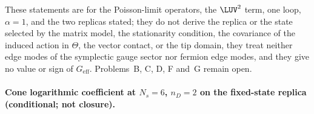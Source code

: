 These statements are for the Poisson-limit operators, the \(\LUV^2\) term, one loop, \(\alpha=1\), and the two replicas stated; they do not derive the replica or the state selected by the matrix model, the stationarity condition, the covariance of the induced action in \(\Theta\), the vector contact, or the tip domain, they treat neither edge modes of the symplectic gauge sector nor fermion edge modes, and they give no value or sign of \(G_{\mathrm{eff}}\). Problems~B, C, D, F and~G remain open.





\paragraph{Cone logarithmic coefficient at \(N_s=6\), \(n_D=2\) on the fixed-state replica (conditional; not closure).} \label{detail:sec-B-paragraphconelogarithmiccoeffi-7}

